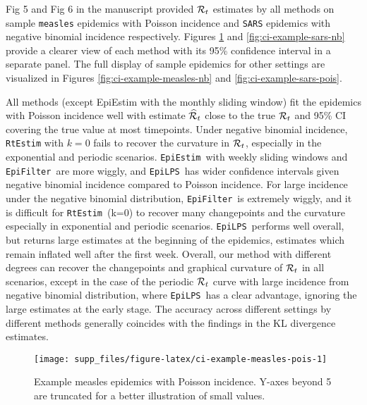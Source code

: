 \documentclass[
]{article}
\begin{document}
Fig 5 and Fig 6 in the manuscript provided \(\mathcal{R}_t\) estimates by all methods on
sample \texttt{measles} epidemics with Poisson incidence and \texttt{SARS} epidemics with negative
binomial incidence respectively. Figures \ref{fig:ci-example-measles-pois} and
\ref{fig:ci-example-sars-nb} provide a clearer view of each method with its
95\% confidence interval in a separate panel. The full display of sample epidemics
for other settings are visualized in Figures \ref{fig:ci-example-measles-nb} and
\ref{fig:ci-example-sars-pois}.

All methods (except EpiEstim with the monthly sliding window) fit the epidemics
with Poisson incidence well with estimate \(\widehat{\mathcal{R}}_t\) close to the true
\(\mathcal{R}_t\) and 95\% CI covering the true value at most timepoints.
Under negative binomial incidence, \texttt{RtEstim} with \(k=0\) fails to recover the
curvature in \(\mathcal{R}_t\), especially in the exponential and periodic scenarios.
\texttt{EpiEstim}~with weekly sliding windows and \texttt{EpiFilter}~are more wiggly, and
\texttt{EpiLPS}~has wider confidence intervals given negative binomial incidence
compared to Poisson incidence. For large incidence under the negative binomial distribution,
\texttt{EpiFilter}~is extremely wiggly, and it is difficult for \texttt{RtEstim}~(k=0) to recover
many changepoints and the curvature especially in exponential and periodic scenarios.
\texttt{EpiLPS}~performs well overall, but returns large estimates at the beginning of
the epidemics, estimates which remain inflated well after the first week. Overall, our method with different
degrees can recover the changepoints and graphical curvature of \(\mathcal{R}_t\) in all
scenarios, except in the case of the periodic \(\mathcal{R}_t\) curve with large incidence
from negative binomial distribution, where \texttt{EpiLPS}~has a clear advantage, ignoring the large
estimates at the early stage.
The accuracy across different settings by different methods
generally coincides with the findings in the KL divergence estimates.

\begin{figure}[!ht]

{\centering \texttt{[image: supp\_files/figure-latex/ci-example-measles-pois-1]} 

}

\caption{Example measles epidemics with Poisson incidence. Y-axes beyond 5 are truncated for a better illustration of small values.}\label{fig:ci-example-measles-pois}
\end{figure}
\end{document}
